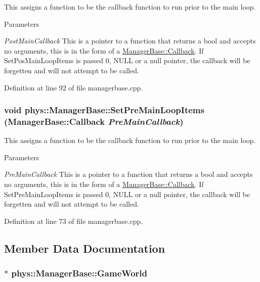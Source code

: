 This assigns a function to be the callback function to run prior to the main loop. 


\begin{DoxyParams}{Parameters}
\item[{\em PostMainCallback}]This is a pointer to a function that returns a bool and accepts no arguments, this is in the form of a \hyperlink{classphys_1_1ManagerBase_a753f5f0127131529767beab2502f480b}{ManagerBase::Callback}. If SetPosMainLoopItems is passed 0, NULL or a null pointer, the callback will be forgetten and will not attempt to be called. \end{DoxyParams}


Definition at line 92 of file managerbase.cpp.

\hypertarget{classphys_1_1ManagerBase_a3fcf207a451d0047f884babadd0bc53e}{
\subsubsection[{SetPreMainLoopItems}]{\setlength{\rightskip}{0pt plus 5cm}void phys::ManagerBase::SetPreMainLoopItems ({\bf ManagerBase::Callback} {\em PreMainCallback})}}
\label{d2/de3/classphys_1_1ManagerBase_a3fcf207a451d0047f884babadd0bc53e}


This assigns a function to be the callback function to run prior to the main loop. 


\begin{DoxyParams}{Parameters}
\item[{\em PreMainCallback}]This is a pointer to a function that returns a bool and accepts no arguments, this is in the form of a \hyperlink{classphys_1_1ManagerBase_a753f5f0127131529767beab2502f480b}{ManagerBase::Callback}. If SetPreMainLoopItems is passed 0, NULL or a null pointer, the callback will be forgetten and will not attempt to be called. \end{DoxyParams}


Definition at line 73 of file managerbase.cpp.



\subsection{Member Data Documentation}
\hypertarget{classphys_1_1ManagerBase_ae2f158b4b2fef1bf2bee2524e0236c7b}{
\subsubsection[{GameWorld}]{$\ast$ {\bf phys::ManagerBase::GameWorld}}}
\label{d2/de3/classphys_1_1ManagerBase_ae2f158b4b2fef1bf2bee2524e0236c7b}


